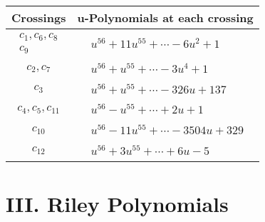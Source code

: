\documentclass[1p]{elsarticle_modified}
\theoremstyle{definition}
\begin{document}
\begin{tabular}{m{50pt}|m{274pt}}
Crossings & \hspace{64pt}u-Polynomials at each crossing \\
\hline $$\begin{aligned}c_{1},c_{6},c_{8}\\c_{9}\end{aligned}$$&$\begin{aligned}
&u^{56}+11 u^{55}+\cdots-6 u^2+1
\end{aligned}$\\
\hline $$\begin{aligned}c_{2},c_{7}\end{aligned}$$&$\begin{aligned}
&u^{56}+u^{55}+\cdots-3 u^4+1
\end{aligned}$\\
\hline $$\begin{aligned}c_{3}\end{aligned}$$&$\begin{aligned}
&u^{56}+u^{55}+\cdots-326 u+137
\end{aligned}$\\
\hline $$\begin{aligned}c_{4},c_{5},c_{11}\end{aligned}$$&$\begin{aligned}
&u^{56}- u^{55}+\cdots+2 u+1
\end{aligned}$\\
\hline $$\begin{aligned}c_{10}\end{aligned}$$&$\begin{aligned}
&u^{56}-11 u^{55}+\cdots-3504 u+329
\end{aligned}$\\
\hline $$\begin{aligned}c_{12}\end{aligned}$$&$\begin{aligned}
&u^{56}+3 u^{55}+\cdots+6 u-5
\end{aligned}$\\
\hline
\end{tabular}\newpage\renewcommand{\arraystretch}{1}
\centering \section*{ III. Riley Polynomials}
\end{document}
